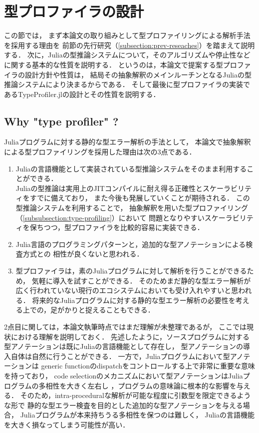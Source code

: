 
\section{型プロファイラの設計} \label{section:3}

この節では，
まず本論文の取り組みとして型プロファイリングによる解析手法を採用する理由を
前節の先行研究（\ref{subsection:prev-reseaches}）を踏まえて説明する．
次に，Juliaの型推論システムについて，そのアルゴリズムや停止性などに関する基本的な性質を説明する．
というのは，本論文で提案する型プロファイラの設計方針や性質は，
結局その抽象解釈のメインルーチンとなるJuliaの型推論システムにより決まるからである．
そして最後に型プロファイラの実装であるTypeProfiler.jlの設計とその性質を説明する．

\subsection{Why "type profiler" ?}

Juliaプログラムに対する静的な型エラー解析の手法として，
本論文で抽象解釈による型プロファイリングを採用した理由は次の3点である．

\begin{enumerate}
  \item Juliaの言語機能として実装されている型推論システムをそのまま利用することができる．\\
        Juliaの型推論は実用上のJITコンパイルに耐え得る正確性とスケーラビリティをすでに備えており，
        また今後も発展していくことが期待される．
        この型推論システムを利用することで，
        抽象解釈を用いた型プロファイリング（\ref{subsubsection:type-profiling}）において
        問題となりやすいスケーラビリティを保ちつつ，型プロファイラを比較的容易に実装できる．
　\item Julia言語のプログラミングパターンと，追加的な型アノテーションによる検査方式との
        相性が良くないと思われる．
  \item 型プロファイラは，素のJuliaプログラムに対して解析を行うことができるため，
        気軽に導入を試すことができる．
        そのためまだ静的な型エラー解析が広く行われていない現行のエコシステムにおいても受け入れやすいと思われる．
        将来的なJuliaプログラムに対する静的な型エラー解析の必要性を考える上での，足がかりと捉えることもできる．
\end{enumerate}

2点目に関しては，本論文執筆時点ではまだ理解が未整理であるが，
ここでは現状における理解を説明しておく．
先述したように，ソースプログラムに対する型アノテーションは既にJuliaの言語機能として存在し，
型アノテーションの導入自体は自然に行うことができる．
一方で，Juliaプログラムにおいて型アノテーションは
generic functionのdispatchをコントロールする上で非常に重要な意味を持っており，
code selectionのメカニズムにおいて型アノテーションはJuliaプログラムの多相性を大きく左右し\footnotemark
，プログラムの意味論に根本的な影響を与える．
そのため，intra-proceduralな解析が可能な程度に引数型を限定できるような形で
静的な型エラー検査を目的とした追加的な型アノテーションを与える場合，
Juliaプログラムが本来持ちうる多相性を保つのは難しく，
Juliaの言語機能を大きく損なってしまう可能性が高い．

